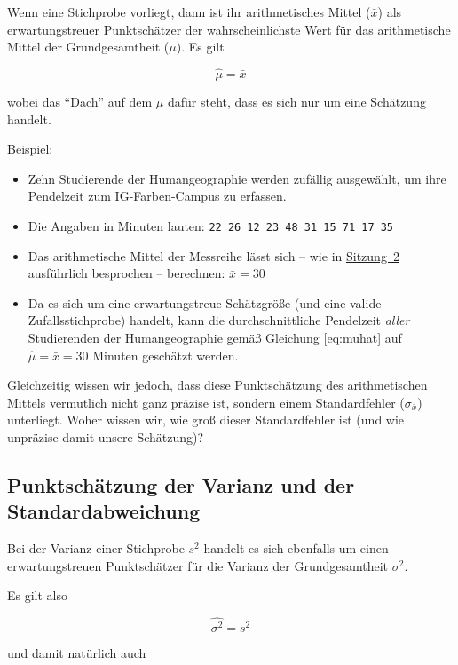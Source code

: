 \documentclass[
  11pt,
  ngerman,
  a4paper,
]{report}
\providecommand{\tightlist}{%
  \setlength{\itemsep}{0pt}\setlength{\parskip}{0pt}}
\begin{document}
Wenn eine Stichprobe vorliegt, dann ist ihr arithmetisches Mittel (\(\bar{x}\)) als erwartungstreuer Punktschätzer der wahrscheinlichste Wert für das arithmetische Mittel der Grundgesamtheit (\(\mu\)). Es gilt

\[
\hat{\mu} = \bar{x}
\label{eq:muhat}
\]

wobei das \enquote{Dach} auf dem \(\mu\) dafür steht, dass es sich nur um eine Schätzung handelt.

Beispiel:

\begin{itemize}
\tightlist
\item
  Zehn Studierende der Humangeographie werden zufällig ausgewählt, um ihre Pendelzeit zum IG-Farben-Campus zu erfassen.
\item
  Die Angaben in Minuten lauten:
  \texttt{22\ 26\ 12\ 23\ 48\ 31\ 15\ 71\ 17\ 35}
\item
  Das arithmetische Mittel der Messreihe lässt sich -- wie in \protect\hyperlink{arithmetisches-mittel}{Sitzung~2} ausführlich besprochen -- berechnen: \(\bar{x}=30\)
\item
  Da es sich um eine erwartungstreue Schätzgröße (und eine valide Zufallsstichprobe) handelt, kann die durchschnittliche Pendelzeit \emph{aller} Studierenden der Humangeographie gemäß Gleichung \eqref{eq:muhat} auf \(\hat{\mu}=\bar{x}=30\) Minuten geschätzt werden.
\end{itemize}

Gleichzeitig wissen wir jedoch, dass diese Punktschätzung des arithmetischen Mittels vermutlich nicht ganz präzise ist, sondern einem Standardfehler (\(\sigma_{\bar{x}}\)) unterliegt. Woher wissen wir, wie groß dieser Standardfehler ist (und wie unpräzise damit unsere Schätzung)?

\hypertarget{punktschuxe4tzung-der-varianz-und-der-standardabweichung}{%
\subsection{Punktschätzung der Varianz und der Standardabweichung}\label{punktschuxe4tzung-der-varianz-und-der-standardabweichung}}

Bei der Varianz einer Stichprobe \(s^2\) handelt es sich ebenfalls um einen erwartungstreuen Punktschätzer für die Varianz der Grundgesamtheit \(\sigma^2\).

Es gilt also

\[
\hat{\sigma^2} = s^2 \label{eq:varhat}
\]

und damit natürlich auch
\end{document}

